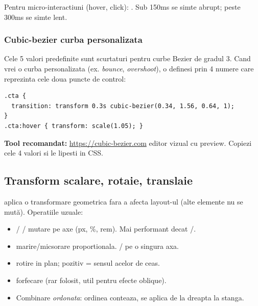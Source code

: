 \begin{ponturi}
Pentru micro-interactiuni (hover, click): . Sub 150ms se simte abrupt; peste 300ms se simte lent.
\end{ponturi}

\subsubsection{Cubic-bezier \textendash{} curba personalizata}

Cele 5 valori predefinite sunt scurtaturi pentru curbe Bezier de gradul 3. Cand vrei o curba personalizata (ex. \emph{bounce}, \emph{overshoot}), o definesi prin 4 numere care reprezinta cele doua puncte de control:

\begin{lstlisting}[style=css, caption={Easing personalizat cu overshoot subtil}]
.cta {
  transition: transform 0.3s cubic-bezier(0.34, 1.56, 0.64, 1);
}
.cta:hover { transform: scale(1.05); }
\end{lstlisting}

\begin{ponturi}
\textbf{Tool recomandat:} \url{https://cubic-bezier.com} \textendash{} editor vizual cu preview. Copiezi cele 4 valori si le lipesti in CSS.
\end{ponturi}

\subsection{Transform \textendash{} scalare, rotaie, translaie}

 aplica o transformare geometrica fara a afecta layout-ul (alte elemente nu se mut\u a). Operatiile uzuale:

\begin{itemize}
  \item {} /  /  \textendash{} mutare pe axe (px, \%, rem). Mai performant decat /.
  \item {} \textendash{} marire/micsorare proportionala. / pe o singura axa.
  \item {} \textendash{} rotire in plan; pozitiv = sensul acelor de ceas.
  \item {} \textendash{} forfecare (rar folosit, util pentru efecte oblique).
  \item Combinare \emph{ordonata}:  \textendash{} ordinea conteaza, se aplica de la dreapta la stanga.
\end{itemize}

